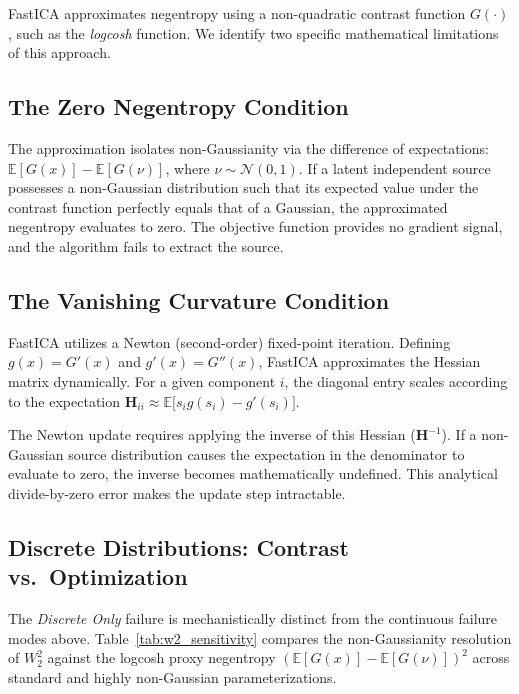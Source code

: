 \documentclass{tpm2026} %
\begin{document}
FastICA approximates negentropy using a non-quadratic contrast function $G(\cdot)$, such as the \textit{logcosh} function. We identify two specific mathematical limitations of this approach.

\subsection{The Zero Negentropy Condition}
The approximation isolates non-Gaussianity via the difference of expectations: $\mathbb{E}[G(x)] - \mathbb{E}[G(\nu)]$, where $\nu \sim \mathcal{N}(0,1)$. If a latent independent source possesses a non-Gaussian distribution such that its expected value under the contrast function perfectly equals that of a Gaussian, the approximated negentropy evaluates to zero. The objective function provides no gradient signal, and the algorithm fails to extract the source.

\subsection{The Vanishing Curvature Condition}
FastICA utilizes a Newton (second-order) fixed-point iteration. Defining $g(x) = G'(x)$ and $g'(x) = G''(x)$, FastICA approximates the Hessian matrix dynamically. For a given component $i$, the diagonal entry scales according to the expectation $\mathbf{H}_{ii} \approx \mathbb{E}\big[s_i g(s_i) - g'(s_i)\big]$.

The Newton update requires applying the inverse of this Hessian ($\mathbf{H}^{-1}$). If a non-Gaussian source distribution causes the expectation in the denominator to evaluate to zero, the inverse becomes mathematically undefined. This analytical divide-by-zero error makes the update step intractable.

\subsection{Discrete Distributions: Contrast vs.\ Optimization}
\label{app:discrete_contrast}
The \textit{Discrete Only} failure is mechanistically distinct from the continuous failure modes above. Table~\ref{tab:w2_sensitivity} compares the non-Gaussianity resolution of $W_2^2$ against the logcosh proxy negentropy $(\mathbb{E}[G(x)]-\mathbb{E}[G(\nu)])^2$ across standard and highly non-Gaussian parameterizations.
\end{document}
